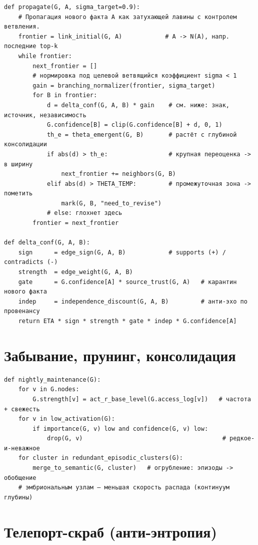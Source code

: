 \begin{lstlisting}[style=pseudo]
def propagate(G, A, sigma_target=0.9):
    # Пропагация нового факта A как затухающей лавины с контролем ветвления.
    frontier = link_initial(G, A)            # A -> N(A), напр. последние top-k
    while frontier:
        next_frontier = []
        # нормировка под целевой ветвящийся коэффициент sigma < 1
        gain = branching_normalizer(frontier, sigma_target)
        for B in frontier:
            d = delta_conf(G, A, B) * gain    # см. ниже: знак, источник, независимость
            G.confidence[B] = clip(G.confidence[B] + d, 0, 1)
            th_e = theta_emergent(G, B)       # растёт с глубиной консолидации
            if abs(d) > th_e:                 # крупная переоценка -> в ширину
                next_frontier += neighbors(G, B)
            elif abs(d) > THETA_TEMP:         # промежуточная зона -> пометить
                mark(G, B, "need_to_revise")
            # else: глохнет здесь
        frontier = next_frontier

def delta_conf(G, A, B):
    sign      = edge_sign(G, A, B)            # supports (+) / contradicts (-)
    strength  = edge_weight(G, A, B)
    gate      = G.confidence[A] * source_trust(G, A)   # карантин нового факта
    indep     = independence_discount(G, A, B)         # анти-эхо по провенансу
    return ETA * sign * strength * gate * indep * G.confidence[A]
\end{lstlisting}

\section{Забывание, прунинг, консолидация}

\begin{lstlisting}[style=pseudo]
def nightly_maintenance(G):
    for v in G.nodes:
        G.strength[v] = act_r_base_level(G.access_log[v])   # частота + свежесть
    for v in low_activation(G):
        if importance(G, v) low and confidence(G, v) low:
            drop(G, v)                                       # редкое-и-неважное
    for cluster in redundant_episodic_clusters(G):
        merge_to_semantic(G, cluster)   # огрубление: эпизоды -> обобщение
    # эмбриональным узлам — меньшая скорость распада (континуум глубины)
\end{lstlisting}

\section{Телепорт-скраб (анти-энтропия)}

